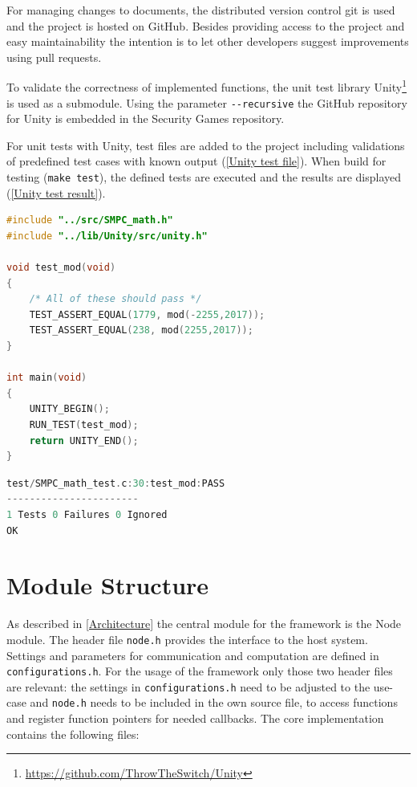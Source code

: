 For managing changes to documents, the distributed version control git is used and the project is hosted on GitHub. Besides providing access to the project and easy maintainability the intention is to let other developers suggest improvements using pull requests.

To validate the correctness of implemented functions, the unit test library Unity\footnote{\url{https://github.com/ThrowTheSwitch/Unity}} is used as a submodule. Using the parameter \lstinline|--recursive| the GitHub repository for Unity is embedded in the Security Games repository. 

For unit tests with Unity, test files are added to the project including validations of predefined test cases with known output (\autoref{Unity test file}). When build for testing (\lstinline|make test|), the defined tests are executed and the results are displayed (\autoref{Unity test result}).

\begin{lstlisting}[language=C, caption=Unity test file, label={Unity test file}, float,floatplacement=H]
#include "../src/SMPC_math.h"
#include "../lib/Unity/src/unity.h"

void test_mod(void)
{
	/* All of these should pass */
	TEST_ASSERT_EQUAL(1779, mod(-2255,2017));
	TEST_ASSERT_EQUAL(238, mod(2255,2017));
}

int main(void)
{
	UNITY_BEGIN();
	RUN_TEST(test_mod);
	return UNITY_END();
}
\end{lstlisting}

\begin{lstlisting}[language=C, caption={Unity test result}, label={Unity test result}, float, floatplacement=H]
test/SMPC_math_test.c:30:test_mod:PASS
-----------------------
1 Tests 0 Failures 0 Ignored 
OK
\end{lstlisting}


\section{Module Structure} \label{Module Structure}

As described in \autoref{Architecture} the central module for the framework is the Node module. The header file \lstinline|node.h| provides the interface to the host system. Settings and parameters for communication and computation are defined in \lstinline|configurations.h|. For the usage of the framework only those two header files are relevant: the settings in \lstinline|configurations.h| need to be adjusted to the use-case and  \lstinline|node.h| needs to be included in the own source file, to access functions and register function pointers for needed callbacks.
The core implementation contains the following files:

